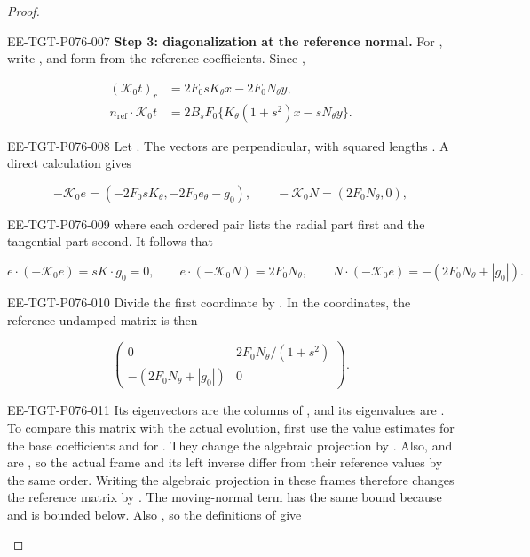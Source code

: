 \begin{proof}
\begin{EESegment}{EE-TGT-P076-007}
\textbf{Step 3: diagonalization at the reference normal.}
For , write , and form  from the reference coefficients. Since ,
\end{EESegment}
\begin{align*}
(\mathcal K_0t)_r&=2F_0sK_\theta x-2F_0N_\theta y,\\
n_{\mathrm{ref}}\cdot\mathcal K_0t&=2B_sF_0\{K_\theta(1+s^2)x-sN_\theta y\}.
\end{align*}
\begin{EESegment}{EE-TGT-P076-008}
Let . The vectors  are perpendicular, with squared lengths . A direct calculation gives
\end{EESegment}
\[
-\mathcal K_0e=(-2F_0sK_\theta,-2F_0e_\theta-g_0),
\qquad
-\mathcal K_0N=(2F_0N_\theta,0),
\]
\begin{EESegment}{EE-TGT-P076-009}
where each ordered pair lists the radial part first and the tangential part second. It follows that
\end{EESegment}
\[
e\cdot(-\mathcal K_0e)=sK\cdot g_0=0,\qquad
e\cdot(-\mathcal K_0N)=2F_0N_\theta,\qquad
N\cdot(-\mathcal K_0e)=-(2F_0N_\theta+|g_0|).
\]
\begin{EESegment}{EE-TGT-P076-010}
Divide the first coordinate by . In the  coordinates, the reference undamped matrix is then
\end{EESegment}
\[
\begin{pmatrix}
0&2F_0N_\theta/(1+s^2)\\
-(2F_0N_\theta+|g_0|)&0
\end{pmatrix}.
\]
\begin{EESegment}{EE-TGT-P076-011}
Its eigenvectors are the columns of , and its eigenvalues are . To compare this matrix with the actual evolution, first use the value estimates for the base coefficients and for . They change the algebraic projection  by . Also,  and  are , so the actual frame and its left inverse differ from their reference values by the same order. Writing the algebraic projection in these frames therefore changes the reference matrix by . The moving-normal term  has the same bound because  and  is bounded below. Also , so the definitions of  give

\end{EESegment}
\end{proof}
